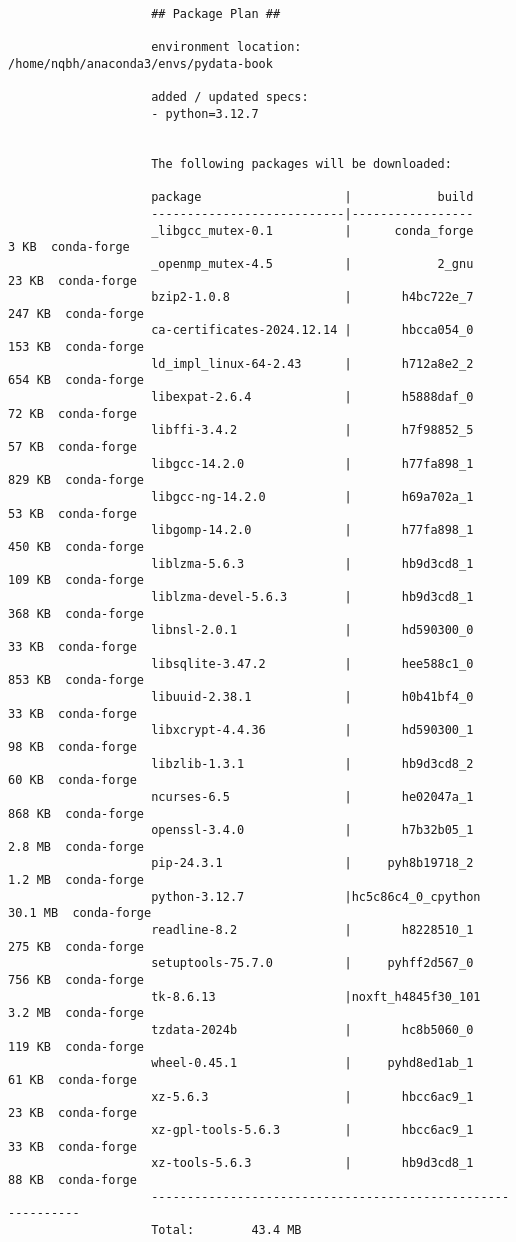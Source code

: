 \documentclass{article}
\begin{document}
\begin{enumerate}
\begin{itemize}
\begin{itemize}
\begin{itemize}
\begin{verbatim}
					## Package Plan ##
					
					environment location: /home/nqbh/anaconda3/envs/pydata-book
					
					added / updated specs:
					- python=3.12.7
					
					
					The following packages will be downloaded:
					
					package                    |            build
					---------------------------|-----------------
					_libgcc_mutex-0.1          |      conda_forge           3 KB  conda-forge
					_openmp_mutex-4.5          |            2_gnu          23 KB  conda-forge
					bzip2-1.0.8                |       h4bc722e_7         247 KB  conda-forge
					ca-certificates-2024.12.14 |       hbcca054_0         153 KB  conda-forge
					ld_impl_linux-64-2.43      |       h712a8e2_2         654 KB  conda-forge
					libexpat-2.6.4             |       h5888daf_0          72 KB  conda-forge
					libffi-3.4.2               |       h7f98852_5          57 KB  conda-forge
					libgcc-14.2.0              |       h77fa898_1         829 KB  conda-forge
					libgcc-ng-14.2.0           |       h69a702a_1          53 KB  conda-forge
					libgomp-14.2.0             |       h77fa898_1         450 KB  conda-forge
					liblzma-5.6.3              |       hb9d3cd8_1         109 KB  conda-forge
					liblzma-devel-5.6.3        |       hb9d3cd8_1         368 KB  conda-forge
					libnsl-2.0.1               |       hd590300_0          33 KB  conda-forge
					libsqlite-3.47.2           |       hee588c1_0         853 KB  conda-forge
					libuuid-2.38.1             |       h0b41bf4_0          33 KB  conda-forge
					libxcrypt-4.4.36           |       hd590300_1          98 KB  conda-forge
					libzlib-1.3.1              |       hb9d3cd8_2          60 KB  conda-forge
					ncurses-6.5                |       he02047a_1         868 KB  conda-forge
					openssl-3.4.0              |       h7b32b05_1         2.8 MB  conda-forge
					pip-24.3.1                 |     pyh8b19718_2         1.2 MB  conda-forge
					python-3.12.7              |hc5c86c4_0_cpython        30.1 MB  conda-forge
					readline-8.2               |       h8228510_1         275 KB  conda-forge
					setuptools-75.7.0          |     pyhff2d567_0         756 KB  conda-forge
					tk-8.6.13                  |noxft_h4845f30_101         3.2 MB  conda-forge
					tzdata-2024b               |       hc8b5060_0         119 KB  conda-forge
					wheel-0.45.1               |     pyhd8ed1ab_1          61 KB  conda-forge
					xz-5.6.3                   |       hbcc6ac9_1          23 KB  conda-forge
					xz-gpl-tools-5.6.3         |       hbcc6ac9_1          33 KB  conda-forge
					xz-tools-5.6.3             |       hb9d3cd8_1          88 KB  conda-forge
					------------------------------------------------------------
					Total:        43.4 MB
					

\end{verbatim}
\end{itemize}
\end{itemize}
\end{itemize}
\end{enumerate}
\end{document}
